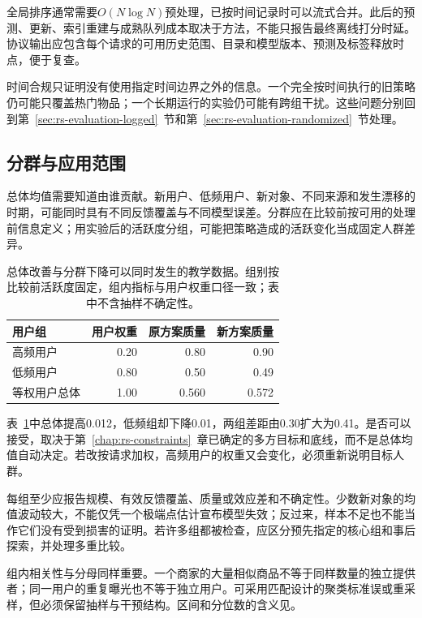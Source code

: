 全局排序通常需要$O(N\log N)$预处理，已按时间记录时可以流式合并。此后的预测、更新、索引重建与成熟队列成本取决于方法，不能只报告最终离线打分时延。协议输出应包含每个请求的可用历史范围、目录和模型版本、预测及标签释放时点，便于复查。

时间合规只证明没有使用指定时间边界之外的信息。一个完全按时间执行的旧策略仍可能只覆盖热门物品；一个长期运行的实验仍可能有跨组干扰。这些问题分别回到第~\ref{sec:rs-evaluation-logged}~节和第~\ref{sec:rs-evaluation-randomized}~节处理。

\subsection{分群与应用范围}
\label{sec:rs-evaluation-groups}

总体均值需要知道由谁贡献。新用户、低频用户、新对象、不同来源和发生漂移的时期，可能同时具有不同反馈覆盖与不同模型误差。分群应在比较前按可用的处理前信息定义；用实验后的活跃度分组，可能把策略造成的活跃变化当成固定人群差异。

\begin{table}[htbp]
  \centering
  \small
  \begin{tabularx}{\linewidth}{@{}Xrrr@{}}
    \toprule
    用户组 & 用户权重 & 原方案质量 & 新方案质量\\
    \midrule
    高频用户 & 0.20 & 0.80 & 0.90\\
    低频用户 & 0.80 & 0.50 & 0.49\\
    等权用户总体 & 1.00 & 0.560 & 0.572\\
    \bottomrule
  \end{tabularx}
  \caption{总体改善与分群下降可以同时发生的教学数据。组别按比较前活跃度固定，组内指标与用户权重口径一致；表中不含抽样不确定性。}
  \label{tab:rs-evaluation-groups}
\end{table}

表~\ref{tab:rs-evaluation-groups}中总体提高0.012，低频组却下降0.01，两组差距由0.30扩大为0.41。是否可以接受，取决于第~\ref{chap:rs-constraints}~章已确定的多方目标和底线，而不是总体均值自动决定。若改按请求加权，高频用户的权重又会变化，必须重新说明目标人群。

每组至少应报告规模、有效反馈覆盖、质量或效应差和不确定性。少数新对象的均值波动较大，不能仅凭一个极端点估计宣布模型失效；反过来，样本不足也不能当作它们没有受到损害的证明。若许多组都被检查，应区分预先指定的核心组和事后探索，并处理多重比较。

组内相关性与分母同样重要。一个商家的大量相似商品不等于同样数量的独立提供者；同一用户的重复曝光也不等于独立用户。可采用匹配设计的聚类标准误或重采样，但必须保留抽样与干预结构。区间和分位数的含义见。


